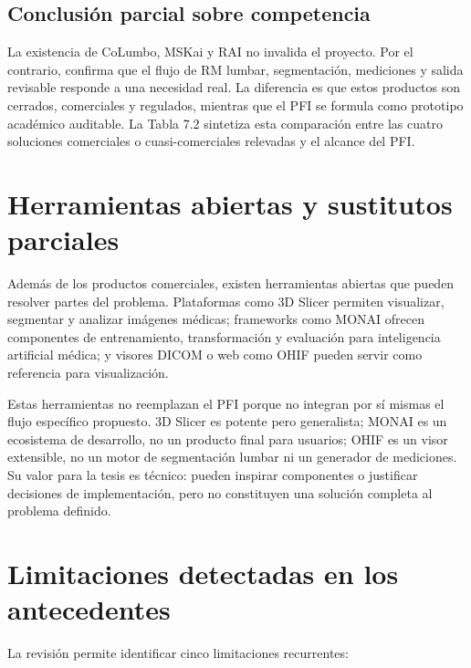 \subsection{Conclusión parcial sobre competencia}

La existencia de CoLumbo, MSKai y RAI no invalida el proyecto. Por el contrario, confirma que el flujo de RM lumbar, segmentación, mediciones y salida revisable responde a una necesidad real. La diferencia es que estos productos son cerrados, comerciales y regulados, mientras que el PFI se formula como prototipo académico auditable. La Tabla 7.2 sintetiza esta comparación entre las cuatro soluciones comerciales o cuasi-comerciales relevadas y el alcance del PFI.


\section{Herramientas abiertas y sustitutos parciales}

Además de los productos comerciales, existen herramientas abiertas que pueden resolver partes del problema. Plataformas como 3D Slicer permiten visualizar, segmentar y analizar imágenes médicas; frameworks como MONAI ofrecen componentes de entrenamiento, transformación y evaluación para inteligencia artificial médica; y visores DICOM o web como OHIF pueden servir como referencia para visualización.

Estas herramientas no reemplazan el PFI porque no integran por sí mismas el flujo específico propuesto. 3D Slicer es potente pero generalista; MONAI es un ecosistema de desarrollo, no un producto final para usuarios; OHIF es un visor extensible, no un motor de segmentación lumbar ni un generador de mediciones. Su valor para la tesis es técnico: pueden inspirar componentes o justificar decisiones de implementación, pero no constituyen una solución completa al problema definido.

\section{Limitaciones detectadas en los antecedentes}

La revisión permite identificar cinco limitaciones recurrentes:

